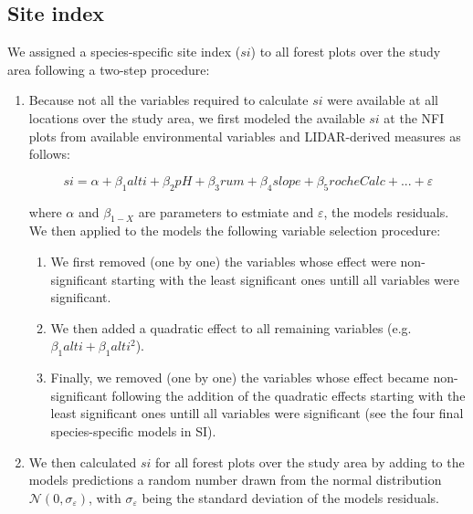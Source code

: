 \documentclass[a4paper]{article}
\begin{document}

\subsection*{Site index}

\noindent We assigned a species-specific site index ($si$) to all forest plots over the study area following a two-step procedure:

\begin{enumerate}
    \item Because not all the variables required to calculate $si$ were available at all locations over the study area, we first modeled the available $si$ at the NFI plots from available environmental variables and LIDAR-derived measures as follows:

    \begin{equation}\label{si}
      si = \alpha + \beta_1 alti + \beta_2 pH +\beta_3 rum +\beta_4 slope +\beta_5 rocheCalc+...+\varepsilon
    \end{equation}

    where $\alpha$ and $\beta_{1-X}$ are parameters to estmiate and $\varepsilon$, the models residuals. We then applied to the models the following variable selection procedure:

    \begin{enumerate}

        \item We first removed (one by one) the variables whose effect were non-significant starting with the least significant ones untill all variables were significant.

        \item We then added a quadratic effect to all remaining variables (e.g. $\beta_1alti + \beta_1alti^2$).

        \item Finally, we removed (one by one) the variables whose effect became non-significant following the addition of the quadratic effects starting with the least significant ones untill all variables were significant (see the four final species-specific models in SI).

  \end{enumerate}

    \item We then calculated $si$ for all forest plots over the study area by adding to the models predictions a random number drawn from the normal distribution $\mathcal{N} (0, \sigma_\varepsilon)$, with $\sigma_\varepsilon$ being the standard deviation of the models residuals.

\end{enumerate}
\end{document}
